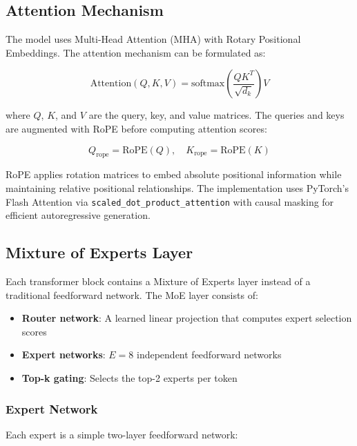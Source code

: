 \documentclass[11pt,a4paper]{article}
\begin{document}
\subsection{Attention Mechanism}

The model uses Multi-Head Attention (MHA) with Rotary Positional Embeddings. The attention mechanism can be formulated as:

\begin{equation}
\text{Attention}(Q, K, V) = \text{softmax}\left(\frac{QK^T}{\sqrt{d_k}}\right)V
\end{equation}

where $Q$, $K$, and $V$ are the query, key, and value matrices. The queries and keys are augmented with RoPE before computing attention scores:

\begin{equation}
Q_{\text{rope}} = \text{RoPE}(Q), \quad K_{\text{rope}} = \text{RoPE}(K)
\end{equation}

RoPE applies rotation matrices to embed absolute positional information while maintaining relative positional relationships. The implementation uses PyTorch's Flash Attention via \texttt{scaled\_dot\_product\_attention} with causal masking for efficient autoregressive generation.

\subsection{Mixture of Experts Layer}

Each transformer block contains a Mixture of Experts layer instead of a traditional feedforward network. The MoE layer consists of:

\begin{itemize}
    \item \textbf{Router network}: A learned linear projection that computes expert selection scores
    \item \textbf{Expert networks}: $E = 8$ independent feedforward networks
    \item \textbf{Top-k gating}: Selects the top-2 experts per token
\end{itemize}

\subsubsection{Expert Network}

Each expert is a simple two-layer feedforward network:
\end{document}
